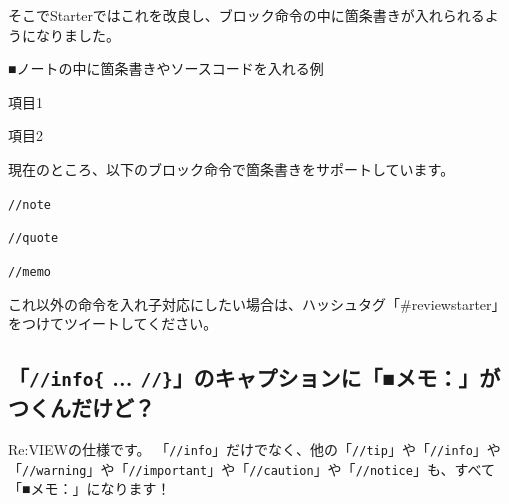 そこでStarterではこれを改良し、ブロック命令の中に箇条書きが入れられるようになりました。

\begin{starterprogram}\end{starterprogram}
\noindent
{}

\starterresult
\begin{starternote}{■ノートの中に箇条書きやソースコードを入れる例}
\begin{starternoteinner}

\begin{starteritemize}
\item 項目1
\item 項目2
\end{starteritemize}

\end{starternoteinner}
\end{starternote}
\endstarterresult

現在のところ、以下のブロック命令で箇条書きをサポートしています。

\begin{starteritemize}
\item \texttt{//note}
\item \texttt{//quote}
\item \texttt{//memo}
\end{starteritemize}

これ以外の命令を入れ子対応にしたい場合は、ハッシュタグ「\#reviewstarter」をつけてツイートしてください。

\subsection{「\texttt{//info\{} ... \texttt{//\}}」のキャプションに「■メモ：」がつくんだけど？}
\label{sec:2-3-3}
\label{subsec-faq-memo}

Re:VIEWの仕様です。
「\texttt{//info}」だけでなく、他の「\texttt{//tip}」や「\texttt{//info}」や「\texttt{//warning}」や「\texttt{//important}」や「\texttt{//caution}」や「\texttt{//notice}」も、すべて「■メモ：」になります！

\begin{starterprogram}\end{starterprogram}
\noindent
{}

